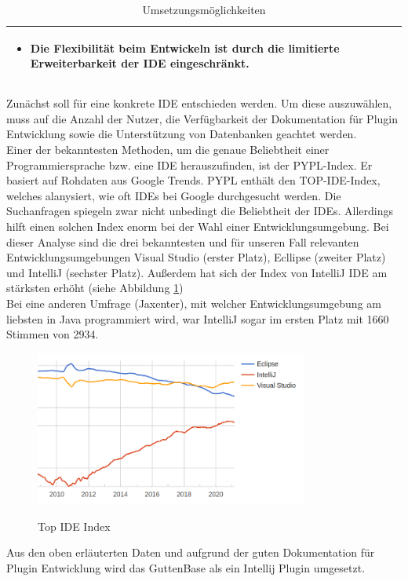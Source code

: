 \begin{table}
\begin{tabular}{ |p{3cm}|p{6cm}|p{6cm}| }
		\begin{itemize}
			\item Die Flexibilität beim Entwickeln ist durch die limitierte Erweiterbarkeit der IDE eingeschränkt.
		\end{itemize} \\
		\hline
		
	\end{tabular}
	\caption{Umsetzungsmöglichkeiten}
	\label{table:tool-options}
\end{table}

Zunächst soll für eine konkrete IDE entschieden werden. Um diese auszuwählen, muss auf die Anzahl der Nutzer, die Verfügbarkeit der Dokumentation für Plugin Entwicklung sowie die Unterstützung von Datenbanken geachtet werden.\\
Einer der bekanntesten Methoden, um die genaue Beliebtheit einer Programmiersprache bzw. eine IDE herauszufinden, ist der PYPL-Index. Er basiert auf Rohdaten aus Google Trends. PYPL enthält den TOP-IDE-Index, welches alanysiert, wie oft IDEs bei Google durchgesucht werden. Die Suchanfragen spiegeln zwar nicht unbedingt die Beliebtheit der IDEs. Allerdings hilft einen solchen Index enorm bei der Wahl einer Entwicklungsumgebung.
Bei dieser Analyse sind die drei bekanntesten und für unseren Fall relevanten Entwicklungsumgebungen Visual Studio (erster Platz), Ecllipse (zweiter Platz) und IntelliJ (sechster Platz). Außerdem hat sich der Index von IntelliJ IDE am stärksten erhöht (siehe Abbildung \ref{img:ide-index})\\
Bei eine anderen Umfrage (Jaxenter), mit welcher Entwicklungsumgebung am liebsten in Java programmiert wird, war IntelliJ sogar im ersten Platz mit 1660 Stimmen von 2934. \\

\begin{figure}[H]
	\caption{Top IDE Index}
	\centering
	\includegraphics[width=0.8\textwidth]{images/ide-index}
	\label{img:ide-index}
\end{figure}
Aus den oben erläuterten Daten und aufgrund der guten Dokumentation für Plugin Entwicklung wird das GuttenBase als ein Intellij Plugin umgesetzt. 


